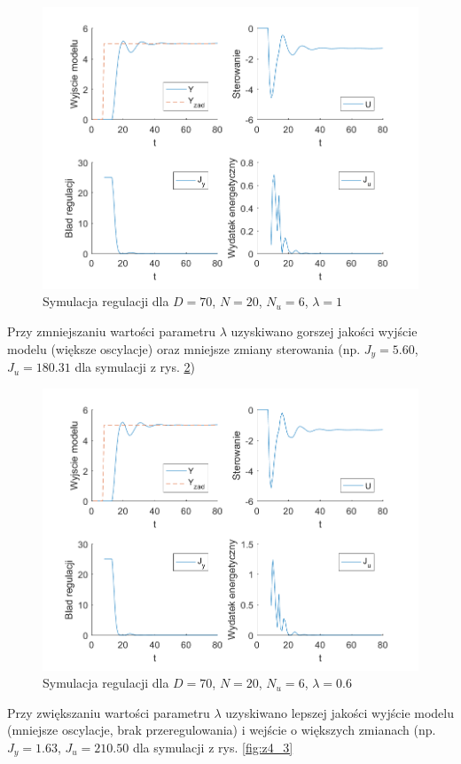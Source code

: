 \documentclass[a4paper, 10pt]{article}
\begin{document}
	\begin{figure}[H]
			\centering
			\includegraphics[width=0.9\linewidth]{z4_70_20_6_1}
			\caption{Symulacja regulacji dla $D=70$, $N=20$, $N_u=6$, $\lambda=1$}
			\label{fig:z4_1}
			\end{figure}
			
	Przy zmniejszaniu wartości parametru $\lambda$ uzyskiwano gorszej jakości wyjście modelu (większe oscylacje) oraz mniejsze zmiany sterowania (np. $J_y=5.60$, $J_u=180.31$ dla symulacji z rys. \ref{fig:z4_2})
	
	\begin{figure}[H]
				\centering
				\includegraphics[width=0.9\linewidth]{z4_70_20_6_06}
				\caption{Symulacja regulacji dla $D=70$, $N=20$, $N_u=6$, $\lambda=0.6$}
				\label{fig:z4_2}
				\end{figure}
				
	Przy zwiększaniu wartości parametru $\lambda$ uzyskiwano lepszej jakości wyjście modelu (mniejsze oscylacje, brak przeregulowania) i wejście o większych zmianach (np. $J_y=1.63$, $J_u=210.50$ dla symulacji z rys. \ref{fig:z4_3}
	
\end{document}
